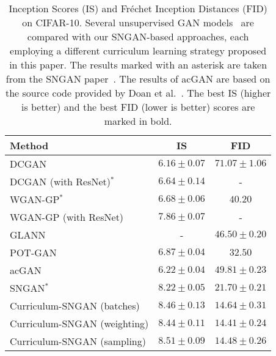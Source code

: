 \documentclass[10pt,twocolumn,letterpaper]{article}
\begin{document}
\begin{table}[t]
\setlength\tabcolsep{2.8pt}
\small{
\begin{center}
\begin{tabular}{|l|c|c|}
\hline
Method                                              & IS                & FID   \\
\hline
\hline
DCGAN~\cite{Radford-ICLR-2016}                      & $6.16\pm0.07$     & $71.07\pm1.06$ \\
DCGAN (with ResNet)$^*$~\cite{Radford-ICLR-2016}    & $6.64\pm0.14$     & - \\
WGAN-GP$^*$~\cite{Miyato-ICLR-2018}                 & $6.68\pm0.06$     & $40.20$ \\
WGAN-GP (with ResNet)~\cite{Gulrajani-NIPS-2017}    & $7.86\pm0.07$     & - \\
GLANN~\cite{Hoshen-CVPR-2019}                       & -                 & $46.50\pm 0.20$ \\
POT-GAN~\cite{Avraham-CVPR-2019}                    & $6.87\pm0.04$     & $32.50$ \\
acGAN~\cite{Doan-AAAI-2019}                         & $6.22\pm0.04$     & $49.81\pm0.23$ \\
\hline
SNGAN$^*$~\cite{Miyato-ICLR-2018}                   & $8.22\pm0.05$     & $21.70\pm0.21$ \\
\hline
Curriculum-SNGAN (batches)                          & $8.46\pm0.13$     & $14.64\pm0.31$ \\
Curriculum-SNGAN (weighting)                        & $8.44\pm0.11$     & $\mathbf{14.41}\pm0.24$ \\
Curriculum-SNGAN (sampling)                         & $\mathbf{8.51}\pm0.09$ & $14.48\pm0.26$ \\
\hline
\end{tabular}
\end{center}
\vspace*{-0.15cm}
\caption{Inception Scores (IS) and Fr\'echet Inception Distances (FID) on CIFAR-10. Several unsupervised GAN models~\cite{Avraham-CVPR-2019,Doan-AAAI-2019,Gulrajani-NIPS-2017,Hoshen-CVPR-2019,Miyato-ICLR-2018,Radford-ICLR-2016} are compared with our SNGAN-based approaches, each employing a different curriculum learning strategy proposed in this paper. The results marked with an asterisk are taken from the SNGAN paper~\cite{Miyato-ICLR-2018}. The results of acGAN are based on the source code provided by Doan et al.~\cite{Doan-AAAI-2019}. The best IS (higher is better) and the best FID (lower is better) scores are marked in bold.\label{tab_results_CIFAR}}
}
\vspace*{-0.1cm}
\end{table}
\end{document}
